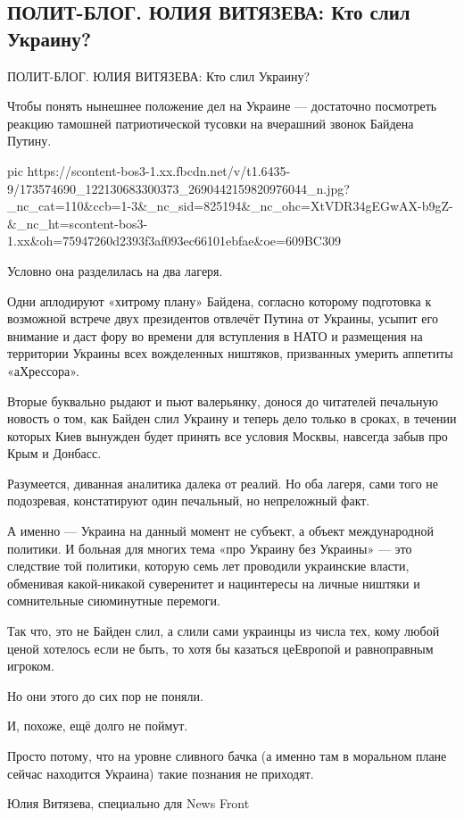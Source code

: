  
 
 
 
 
\subsection{ПОЛИТ-БЛОГ. ЮЛИЯ ВИТЯЗЕВА:  Кто слил Украину?}
\label{sec:14_04_2021.fb.respublikalnr.2.kto_slil_ukrainu}

ПОЛИТ-БЛОГ. ЮЛИЯ ВИТЯЗЕВА:  Кто слил Украину?

Чтобы понять нынешнее положение дел на Украине — достаточно посмотреть реакцию
тамошней патриотической тусовки на вчерашний звонок Байдена Путину.


\ifcmt
  pic https://scontent-bos3-1.xx.fbcdn.net/v/t1.6435-9/173574690_122130683300373_2690442159820976044_n.jpg?_nc_cat=110&ccb=1-3&_nc_sid=825194&_nc_ohc=XtVDR34gEGwAX-b9gZ-&_nc_ht=scontent-bos3-1.xx&oh=75947260d2393f3af093ec66101ebfae&oe=609BC309
\fi


Условно она разделилась на два лагеря.

Одни аплодируют «хитрому плану» Байдена, согласно которому подготовка к
возможной встрече двух президентов отвлечёт Путина от Украины, усыпит его
внимание и даст фору во времени для вступления в НАТО и размещения на
территории Украины всех вожделенных ништяков, призванных умерить аппетиты
«аХрессора».

Вторые буквально рыдают и пьют валерьянку, донося до читателей печальную
новость о том, как Байден слил Украину и теперь дело только в сроках, в течении
которых Киев вынужден будет принять все условия Москвы, навсегда забыв про Крым
и Донбасс.

Разумеется, диванная аналитика далека от реалий. Но оба лагеря, сами того не
подозревая, констатируют один печальный, но непреложный факт.

А именно — Украина на данный момент не субъект, а объект международной
политики. И больная для многих тема «про Украину без Украины» — это следствие
той политики, которую семь лет проводили украинские власти, обменивая
какой-никакой суверенитет и нацинтересы на личные ништяки и сомнительные
сиюминутные перемоги.

Так что, это не Байден слил, а слили сами украинцы из числа тех, кому любой
ценой хотелось если не быть, то хотя бы казаться цеЕвропой и равноправным
игроком.

Но они этого до сих пор не поняли.

И, похоже, ещё долго не поймут.

Просто потому, что на уровне сливного бачка (а именно там в моральном плане
сейчас находится Украина) такие познания не приходят.

Юлия Витязева, специально для News Front
